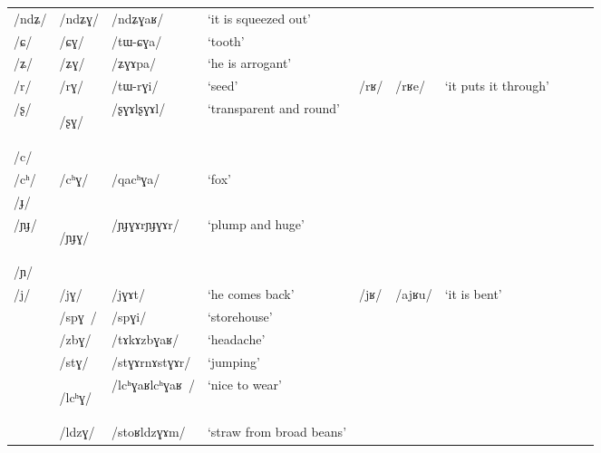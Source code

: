 \documentclass[12pt]{article}
\newcommand{\ipa}[1]{\mbox{\phon/#1/}}
\newcommand{\deux}[1]{\ipa{#1}\addtocounter{2clusters}{1}}
\newcommand{\trois}[1]{\ipa{#1}\addtocounter{3clusters}{1}}
\newcommand{\idph}[1]{\cellcolor{gray}\textbf{#1}}
\begin{document}
\begin{landscape}
\begin{longtable}{llllllllll}
\ipa{ndʑ} & \deux{ndʑɣ} & \ipa{ndʑɣaʁ} & `it is squeezed out' & & & \\ 
\ipa{ɕ} & \deux{ɕɣ} & \ipa{tɯ-ɕɣa} & `tooth' & & & \\ 
\ipa{ʑ} & \deux{ʑɣ} & \ipa{ʑɣɤpa} & `he is arrogant' & & & \\ 
\ipa{r} & \deux{rɣ} & \ipa{tɯ-rɣi} & `seed' &\deux{rʁ} &\ipa{rʁe} & `it puts it through' \\ 
\ipa{ʂ} & \deux{ʂɣ} \idph{} & \ipa{ʂɣɤlʂɣɤl} & `transparent and round' & & & \\ 
\ipa{c} & & & & & & \\ 
\ipa{cʰ} & \deux{cʰɣ} & \ipa{qacʰɣa} & `fox' & & & \\ 
\ipa{ɟ} & & & & & & \\ 
\ipa{ɲɟ} & \deux{ɲɟɣ} \idph{} & \ipa{ɲɟɣɤrɲɟɣɤr} & `plump and huge' & & & \\ 
\ipa{ɲ} & & & & & & \\ 
\ipa{j} & \deux{jɣ} & \ipa{jɣɤt} & `he comes back' &\deux{jʁ} &\ipa{ajʁu} & `it is bent' \\ 
\midrule      
 &\trois{spɣ } &\ipa{spɣi} & `storehouse' & & &\\
 &\trois{zbɣ} &\ipa{tɤkɤzbɣaʁ} & `headache' & & &\\
 &\trois{stɣ} &\ipa{stɣɤrnɤstɣɤr} & `jumping' & & &\\
 &\trois{lcʰɣ} \idph{} &\ipa{lcʰɣaʁlcʰɣaʁ } & `nice to wear' & & &\\
 &\trois{ldzɣ} &\ipa{stoʁldzɣɤm} & `straw from broad beans' & & &\\

\end{longtable}
\end{landscape}
\end{document}
